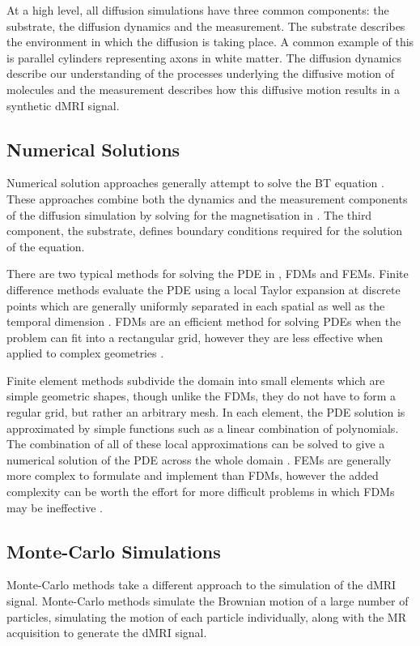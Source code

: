 At a high level, all diffusion simulations have three common components: the substrate, the diffusion dynamics and the measurement.
The substrate describes the environment in which the diffusion is taking place. A common example of this is parallel cylinders representing axons in white matter.
The diffusion dynamics describe our understanding of the processes underlying the diffusive motion of molecules and the measurement describes how this diffusive motion results in a synthetic \ac{dMRI} signal.
\subsection{Numerical Solutions}
\label{sec:numerical_solutions}
Numerical solution approaches generally attempt to solve the \acl{BT} equation \cite{Torrey1956}.
These approaches combine both the dynamics and the measurement components of the diffusion simulation by solving for the magnetisation in  .
The third component, the substrate, defines boundary conditions required for the solution of the equation. 

There are two typical methods for solving the \ac{PDE} in , \acp{FDM} and \acp{FEM}.
Finite difference methods evaluate the \ac{PDE} using a local Taylor expansion at discrete points which are generally uniformly separated in each spatial as well as the temporal dimension \cite{Grossmann2007}.
\acp{FDM} are an efficient method for solving \acp{PDE} when the problem can fit into a rectangular grid, however they are less effective when applied to complex geometries \cite{Hagslatt2003, Grossmann2007}.

Finite element methods subdivide the domain into small elements which are simple geometric shapes, though unlike the \acp{FDM}, they do not have to form a regular grid, but rather an arbitrary mesh.
In each element, the \ac{PDE} solution is approximated by simple functions such as a linear combination of polynomials.
The combination of all of these local approximations can be solved to give a numerical solution of the \ac{PDE} across the whole domain \cite{Logan2007}.
\acp{FEM} are generally more complex to formulate and implement than \acp{FDM}, however the added complexity can be worth the effort for more difficult problems in which \acp{FDM} may be ineffective \cite{Iserles2009}.

\subsection{Monte-Carlo Simulations}
\label{sec:montecarlo}
Monte-Carlo methods take a different approach to the simulation of the \ac{dMRI} signal. Monte-Carlo methods simulate the Brownian motion of a large number of particles, simulating the motion of each particle individually, along with the MR acquisition to generate the \ac{dMRI} signal.


